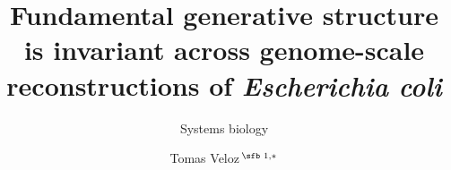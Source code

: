 \documentclass[nocrop]{bioinfo}
\begin{document}

\subtitle{Systems biology}

\title[Fundamental generative structure across \textit{E. coli} reconstructions]{Fundamental generative structure is invariant across genome-scale reconstructions of \textit{Escherichia coli}}

\author[Veloz \textit{et~al}.]{Tomas Veloz\,$^{\text{\sfb 1,}*}$}
\address{$^{\text{\sf 1}}$Departamento de Matem\'{a}ticas, Universidad Tecnol\'{o}gica Metropolitana, Santiago 833038, Chile}



\editor{}
\end{document}

